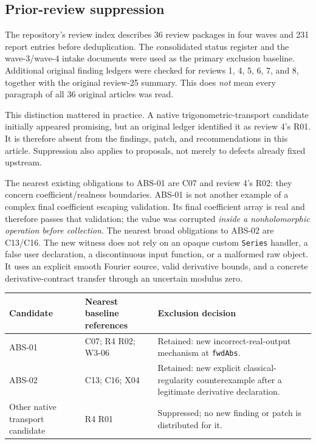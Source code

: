 \documentclass[11pt,a4paper]{article}
\newcommand{\code}[1]{\nolinkurl{#1}}
\begin{document}
\subsection{Prior-review suppression}

The repository's review index describes 36 review packages in four waves and 231 report entries before deduplication. The consolidated status register and the wave-3/wave-4 intake documents were used as the primary exclusion baseline. Additional original finding ledgers were checked for reviews 1, 4, 5, 6, 7, and 8, together with the original review-25 summary. This does \emph{not} mean every paragraph of all 36 original articles was read.\cite{reviews,status,wave3,wave4,r1,r4,r5,r6,r7,r8,r25}

This distinction mattered in practice. A native trigonometric-transport candidate initially appeared promising, but an original ledger identified it as review 4's R01. It is therefore absent from the findings, patch, and recommendations in this article. Suppression also applies to proposals, not merely to defects already fixed upstream.

The nearest existing obligations to ABS-01 are C07 and review 4's R02: they concern coefficient/realness boundaries. ABS-01 is not another example of a complex final coefficient escaping validation. Its final coefficient array is real and therefore passes that validation; the value was corrupted \emph{inside a nonholomorphic operation before collection}. The nearest broad obligations to ABS-02 are C13/C16. The new witness does not rely on an opaque custom \code{Series} handler, a false user declaration, a discontinuous input function, or a malformed raw object. It uses an explicit smooth Fourier source, valid derivative bounds, and a concrete derivative-contract transfer through an uncertain modulus zero.

\begin{center}
\begin{tabular}{L{24mm}L{43mm}L{82mm}}
\toprule
Candidate & Nearest baseline references & Exclusion decision\\
\midrule
ABS-01 & C07; R4 R02; W3-06 & Retained: new incorrect-real-output mechanism at \code{fwdAbs}.\\[3pt]
ABS-02 & C13; C16; X04 & Retained: new explicit classical-regularity counterexample after a legitimate derivative declaration.\\[3pt]
Other native transport candidate & R4 R01 & Suppressed; no new finding or patch is distributed for it.\\
\bottomrule
\end{tabular}
\end{center}
\end{document}
